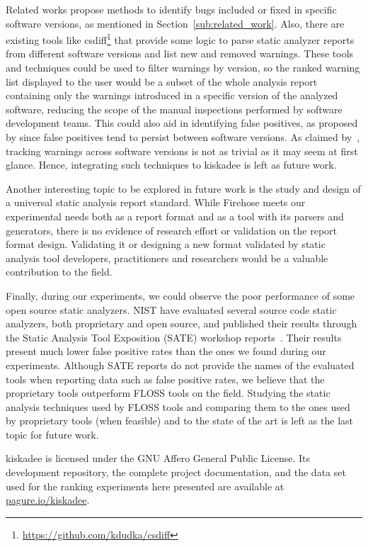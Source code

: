 Related works propose methods to identify bugs included or fixed in specific
software versions, as mentioned in Section~\ref{sub:related_work}.  Also, there
are existing tools like csdiff\footnote{\url{https://github.com/kdudka/csdiff}}
that provide some logic to parse static analyzer reports from different
software versions and list new and removed warnings.  These tools and
techniques could be used to filter warnings by version, so the ranked warning
list displayed to the user would be a subset of the whole analysis report
containing only the warnings introduced in a specific version of the analyzed
software, reducing the scope of the manual inspections performed by software
development teams.  This could also aid in identifying false positives, as
proposed by \cite{kim_which_2007} since false positives tend to
persist between software versions. As claimed by~\cite{spacco_tracking_2006}, tracking warnings across software versions is
not as trivial as it may seem at first glance. Hence, integrating such techniques
to kiskadee is left as future work.

Another interesting topic to be explored in future work is the study and design
of a universal static analysis report standard. While Firehose meets our
experimental needs both as a report format and as a tool with its parsers and
generators, there is no evidence of research effort or validation on the report
format design. Validating it or designing a new format validated by static
analysis tool developers, practitioners and researchers would be a valuable
contribution to the field.

Finally, during our experiments, we could observe the poor performance of some
open source static analyzers. NIST have evaluated several source code static
analyzers, both proprietary and open source, and published their results
through the Static Analysis Tool Exposition (SATE) workshop
reports~\citep{okun2013report}. Their results present much lower false positive
rates than the ones we found during our experiments. Although SATE reports do
not provide the names of the evaluated tools when reporting data such as false
positive rates, we believe that the proprietary tools outperform FLOSS tools on
the field. Studying the static analysis techniques used by FLOSS tools and
comparing them to the ones used by proprietary tools (when feasible) and to the
state of the art is left as the last topic for future work.

kiskadee is licensed under the GNU Affero General Public License. Its
development repository, the complete project documentation, and the data set
used for the ranking experiments here presented are available at
\url{pagure.io/kiskadee}.
